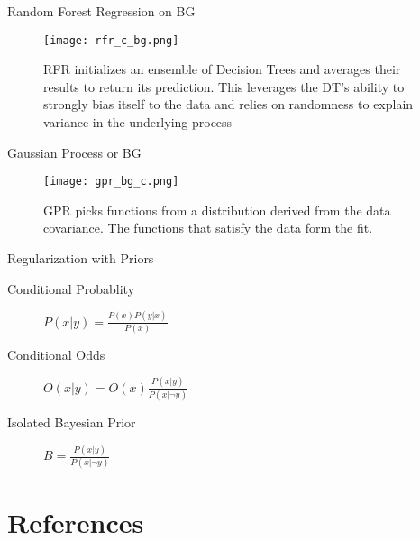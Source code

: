 \documentclass[10pt, compress]{beamer}
\begin{document}
\begin{frame}[allowframebreaks]{Random Forest Regression on BG}
\begin{figure}[htbp]
\centering
\texttt{[image: rfr\_c\_bg.png]}
\caption{RFR initializes an ensemble of Decision Trees and averages their results to return its prediction. This leverages the DT's ability to strongly bias itself to the data and relies on randomness to explain variance in the underlying process}
\end{figure}
\end{frame}
\begin{frame}[allowframebreaks]{Gaussian Process or BG}
\begin{figure}[htbp]
\centering
\texttt{[image: gpr\_bg\_c.png]}
\caption{GPR picks functions from a distribution derived from the data covariance. The functions that satisfy the data form the fit.}
\end{figure}
\begin{block}{Regularization with Priors}
\begin{description}
\item[{Conditional Probablity}] \(P(x|y) = \frac{P(x)P(y|x)}{P(x)}\)
\item[{Conditional Odds}] \(O(x|y) = O(x)\frac{P(x|y)}{P(x|\neg{}y)}\)
\item[{Isolated Bayesian Prior}] \(B = \frac{P(x|y)}{P(x|\neg{}y)}\)
\end{description}
\end{block}
\end{frame}

\section{References}
\label{sec:org8b72765}


\end{document}

